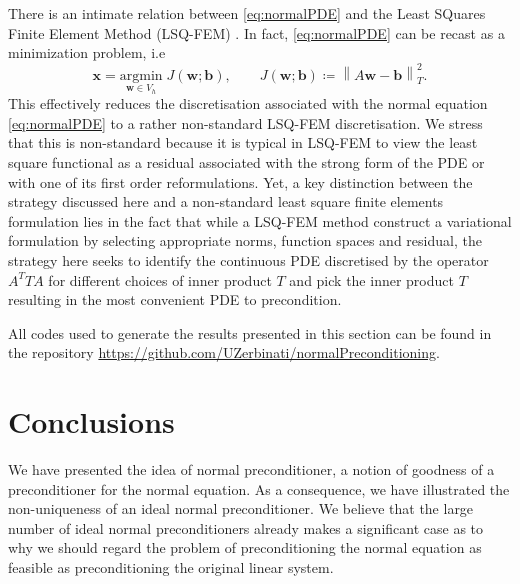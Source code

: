 \documentclass[hidelinks,onefignum,onetabnum]{siamart220329}
\let\vec\mathbf
\newcommand{\norm}[1]{\left\lVert#1\right\rVert}
\begin{document}
\begin{remark}
    There is an intimate relation between \eqref{eq:normalPDE} and the Least SQuares Finite Element Method (LSQ-FEM) \cite{Bochev}.
    In fact, \eqref{eq:normalPDE} can be recast as a minimization problem, i.e
    \begin{equation}
        \vec{x} =  \underset{\vec{w}\in V_h}{\text{argmin}}\; J(\vec{w};\vec{b}), \qquad J(\vec{w};\vec{b})\coloneqq \norm{A\vec{w} - \vec{b}}_T^2.
    \end{equation}
    This effectively reduces the discretisation associated with the normal equation \eqref{eq:normalPDE} to a rather non-standard LSQ-FEM discretisation. We stress that this is non-standard because it is typical in LSQ-FEM to view the least square functional as a residual associated with the strong form of the PDE or with one of its first order reformulations.
    Yet, a key distinction between the strategy discussed here and a non-standard least square finite elements formulation lies in the fact that while a LSQ-FEM method construct a variational formulation by selecting appropriate norms, function spaces and residual, the strategy here seeks to identify the continuous PDE discretised by the operator \( A^T T A \) for different choices of inner product $T$ and pick the inner product $T$ resulting in the most convenient PDE to precondition.
\end{remark}

All codes used to %
generate the results presented in this section can be found in the repository \url{https://github.com/UZerbinati/normalPreconditioning}.
\section{Conclusions}
\label{sec:conclusion}
We have presented the idea of {normal preconditioner}, a notion of goodness of a preconditioner for the normal equation. As a consequence, we have illustrated the non-uniqueness of an ideal {normal preconditioner}. We believe that the large number of ideal {normal preconditioners} already makes a significant case as to why we should regard the problem of preconditioning the normal equation as feasible as preconditioning the original linear system.
\end{document}
